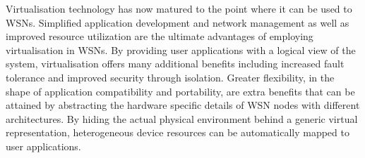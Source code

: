 \bigskip
Virtualisation technology has now matured to the point where it can be used to WSNs. Simplified application development and network management as well as improved resource utilization are the ultimate advantages of employing virtualisation in WSNs. By providing user applications with a logical view of the system, virtualisation  offers many additional benefits including increased fault tolerance and improved security through isolation. Greater flexibility, in the shape of application compatibility and portability, are extra benefits that can be attained by abstracting the hardware specific details of WSN nodes with different architectures. By hiding the actual physical environment behind a generic virtual representation, heterogeneous device resources can be automatically mapped to user applications.

